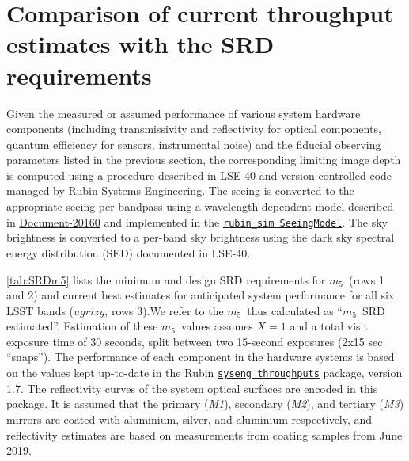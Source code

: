 \documentclass[PST,authoryear,toc]{lsstdoc}
\newcommand{\mf}{\ensuremath{m_5}}
\begin{document}
\section{Comparison of current throughput estimates with the SRD requirements \label{sec:SRD}}

Given the measured or assumed performance of various system hardware components (including transmissivity and reflectivity
for optical components, quantum efficiency for sensors, instrumental noise) and the fiducial observing
parameters listed in the previous section, the corresponding limiting image depth is computed using a procedure
described in
\href{https://docushare.lsst.org/docushare/dsweb/Get/LSE-40}{{LSE-40}}
and version-controlled code managed by Rubin Systems Engineering. The seeing is converted to the appropriate
seeing per bandpass using a wavelength-dependent model described in
\href{https://docushare.lsst.org/docushare/dsweb/Get/Document-20160}{{Document-20160}}
and implemented in the
\href{https://github.com/lsst/rubin_sim/blob/main/rubin_sim/site_models/seeingModel.py}{{\tt rubin\_sim SeeingModel}}.
The sky brightness is converted to a per-band sky brightness using the dark sky spectral energy distribution (SED) documented in LSE-40.


\autoref{tab:SRDm5} lists the minimum and design SRD requirements for \mf\ (rows 1 and 2) and current best estimates for anticipated system performance for all six LSST bands ($ugrizy$, rows 3).We refer to the \mf\ thus calculated as  ``\mf\ SRD estimated''. Estimation of these \mf\ values assumes $X=1$ and a total visit exposure time of 30 seconds, split between two 15-second exposures (2x15 sec ``snaps''). The performance of each component in the hardware systems is based on the values kept up-to-date in the Rubin \href{https://github.com/lsst-pst/syseng_throughputs}{{\tt syseng\_throughputs}} package, version 1.7. {The  reflectivity curves of the system optical surfaces are encoded in this package. It is assumed that the primary ({\it M1}), secondary ({\it M2}), and tertiary ({\it M3}) mirrors are coated with aluminium, silver, and aluminium respectively, and reflectivity estimates are based on measurements from coating samples from June 2019.}
\end{document}
